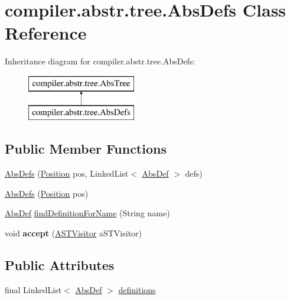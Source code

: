 \hypertarget{classcompiler_1_1abstr_1_1tree_1_1_abs_defs}{}\section{compiler.\+abstr.\+tree.\+Abs\+Defs Class Reference}
\label{classcompiler_1_1abstr_1_1tree_1_1_abs_defs}
Inheritance diagram for compiler.\+abstr.\+tree.\+Abs\+Defs\+:\begin{figure}[H]
\begin{center}
\leavevmode
\includegraphics[height=2.000000cm]{classcompiler_1_1abstr_1_1tree_1_1_abs_defs}
\end{center}
\end{figure}
\subsection*{Public Member Functions}
\begin{DoxyCompactItemize}
\item 
\hyperlink{classcompiler_1_1abstr_1_1tree_1_1_abs_defs_af7341645192f5d0340f95596765c19a0}{Abs\+Defs} (\hyperlink{classcompiler_1_1_position}{Position} pos, Linked\+List$<$ \hyperlink{classcompiler_1_1abstr_1_1tree_1_1def_1_1_abs_def}{Abs\+Def} $>$ defs)
\item 
\hyperlink{classcompiler_1_1abstr_1_1tree_1_1_abs_defs_a1d9cc2674048c7223c01801fe2c9ab80}{Abs\+Defs} (\hyperlink{classcompiler_1_1_position}{Position} pos)
\item 
\hyperlink{classcompiler_1_1abstr_1_1tree_1_1def_1_1_abs_def}{Abs\+Def} \hyperlink{classcompiler_1_1abstr_1_1tree_1_1_abs_defs_ab987f889df19003f210cbe618732079c}{find\+Definition\+For\+Name} (String name)
\item 
\mbox{\label{classcompiler_1_1abstr_1_1tree_1_1_abs_defs_a15daf00b42ed9d42d8962630fe7501e7}} 
void {\bfseries accept} (\hyperlink{interfacecompiler_1_1abstr_1_1_a_s_t_visitor}{A\+S\+T\+Visitor} a\+S\+T\+Visitor)
\end{DoxyCompactItemize}
\subsection*{Public Attributes}
\begin{DoxyCompactItemize}
\item 
final Linked\+List$<$ \hyperlink{classcompiler_1_1abstr_1_1tree_1_1def_1_1_abs_def}{Abs\+Def} $>$ \hyperlink{classcompiler_1_1abstr_1_1tree_1_1_abs_defs_a831952661ca84cbf1c97a84f9532b9ca}{definitions}
\end{DoxyCompactItemize}


